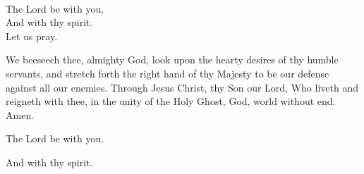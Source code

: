 \\
  \rubric{\Vbar}The Lord be with you.
\\
  \rubric{\Rbar}And with thy spirit.
\\
Let us pray.

We beeseech thee, almighty God, look upon the hearty desires of thy humble servants, and stretch forth the right hand of thy Majesty to be our defense against all our enemies. Through Jesus Christ, thy Son our Lord, Who liveth and reigneth with thee, in the unity of the Holy Ghost, God, world without end. \rubric{\Rbar} Amen.

  \rubric{\Vbar}The Lord be with you.

  \rubric{\Rbar}And with thy spirit.
